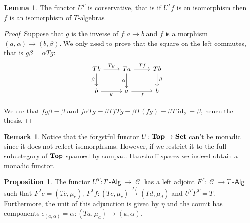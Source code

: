 \documentclass[a4paper,11pt,oneside,openany]{scrbook}
\newcommand{\catname}[1]{{\normalfont\textbf{#1}}}
\DeclareMathOperator{\Alg}{-\mathsf{Alg}}
\newcommand{\Set}{\catname{Set}}
\newcommand{\Top}{\catname{Top}}
\DeclareMathOperator{\C}{\mathcal{C}}
\DeclareMathOperator{\id}{id}
\theoremstyle{definition}
\theoremstyle{definition}
\newtheorem{prop}[thm]{Proposition}
\newtheorem{lemma}[thm]{Lemma}
\newtheorem{rmk}[thm]{Remark}
\begin{document}
	\begin{lemma}
		The functor $U^T$ is conservative, that is if $U^Tf$ is an isomorphism then $f$ is an isomorphism of $T$-algebras.
	\end{lemma}
	\begin{proof}
		Suppose that $g$ is the inverse of $f\colon a\rightarrow b$ and $f$ is a morphism $(a,\alpha)\rightarrow (b,\beta)$. We only need to prove that the square on the left commutes, that is $g\beta=\alpha Tg$:
		\[
			\begin{tikzcd}
				Tb\arrow["\beta"']{d}\arrow["Tg"]{r}
				& Ta\arrow["\alpha"']{d}\arrow["Tf"]{r}
				& Tb\arrow["\beta"]{d} \\
				b\arrow["g"']{r}
				& a\arrow["f"']{r}
				& b
			\end{tikzcd}
		\]
		
	We see that $fg\beta=\beta$ and $f\alpha Tg=\beta Tf Tg=\beta T(fg)=\beta T\id_b=\beta$, hence the thesis.
	\end{proof}
    \begin{rmk}
     Notice that the forgetful functor $U\colon\Top\to\Set$ can't be monadic since it does not reflect isomorphisms. However, if we restrict it to the full subcategory of $\Top$ spanned by compact Hausdorff spaces we indeed obtain a monadic functor.
    \end{rmk}
	\begin{prop}
		The functor $U^T\colon T\Alg\rightarrow\C$ has a left adjoint $F^T\colon\C\rightarrow T\Alg$ such that $F^Tc=(Tc,\mu_{c})$, $F^Tf\colon(Tc,\mu_{c})\xrightarrow{Tf} (Td,\mu_{d})$ and $U^TF^T=T$. Furthermore, the unit of this adjunction is given by $\eta$ and the counit has components $\epsilon_{(a,\alpha)}=\alpha\colon(Ta,\mu_a)\to(a,\alpha)$.
	\end{prop}
\end{document}
